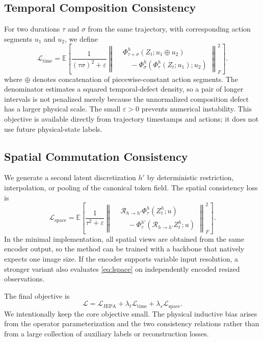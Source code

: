 \documentclass{article}
\theoremstyle{plain}
\theoremstyle{definition}
\theoremstyle{remark}
\newcommand{\PhiOp}{\Phi}
\newcommand{\Restr}{\mathcal{R}}
\newcommand{\Loss}{\mathcal{L}}
\begin{document}
\subsection{Temporal Composition Consistency}
For two durations $\tau$ and $\sigma$ from the same trajectory, with corresponding action segments $u_1$ and $u_2$, we define
\begin{equation}
\Loss_{\mathrm{time}}
=
\mathbb{E}\!\left[
\frac{1}{(\tau\sigma)^2+\varepsilon}
\left\|
\begin{aligned}
&\PhiOp^{h}_{\tau+\sigma}(Z_t;u_1\oplus u_2)\\[-1mm]
&\quad-
\PhiOp^{h}_{\sigma}
(\PhiOp^{h}_{\tau}(Z_t;u_1);u_2)
\end{aligned}
\right\|_F^2
\right].
\label{eq:ltime}
\end{equation}
where $\oplus$ denotes concatenation of piecewise-constant action segments. The denominator estimates a squared temporal-defect density, so a pair of longer intervals is not penalized merely because the unnormalized composition defect has a larger physical scale. The small $\varepsilon>0$ prevents numerical instability. This objective is available directly from trajectory timestamps and actions; it does not use future physical-state labels.

\subsection{Spatial Commutation Consistency}
We generate a second latent discretization $h'$ by deterministic restriction, interpolation, or pooling of the canonical token field. The spatial consistency loss is
\begin{equation}
\Loss_{\mathrm{space}}
=
\mathbb{E}\!\left[
\frac{1}{\tau^2+\varepsilon}
\left\|
\begin{aligned}
&\Restr_{h\rightarrow h'}
\PhiOp^{h}_{\tau}(Z_t^h;u)\\[-1mm]
&\quad-
\PhiOp^{h'}_{\tau}
(\Restr_{h\rightarrow h'}Z_t^h;u)
\end{aligned}
\right\|_F^2
\right].
\label{eq:lspace}
\end{equation}
In the minimal implementation, all spatial views are obtained from the same encoder output, so the method can be trained with a backbone that natively expects one image size. If the encoder supports variable input resolution, a stronger variant also evaluates \cref{eq:lspace} on independently encoded resized observations.

The final objective is
\begin{equation}
    \Loss
    =
    \Loss_{\mathrm{JEPA}}
    +\lambda_t\Loss_{\mathrm{time}}
    +\lambda_s\Loss_{\mathrm{space}}.
    \label{eq:full_loss}
\end{equation}
We intentionally keep the core objective small. The physical inductive bias arises from the operator parameterization and the two consistency relations rather than from a large collection of auxiliary labels or reconstruction losses.
\end{document}
